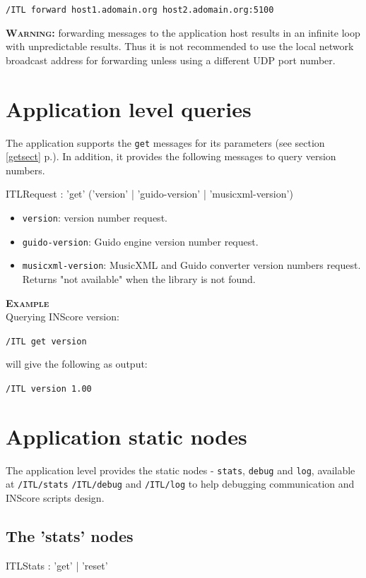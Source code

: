 \documentclass[a4paper,twoside]{report}
\newcommand{\sublevel}[1]	{\section{#1}}
\newcommand{\subsublevel}[1]	{\subsection{#1}}
\newcommand{\fullref}[1]	{\ref{#1} p.\pageref{#1}}
\newcommand{\OSC}[1]		{\texttt{#1}}
\newcommand{\example}		{\textbf{\hspace{-1.5cm}\textbf{\textsc{Example }}}}
\newcommand{\sample}	[1]			{\vspace{-2mm}\begin{center}\colorbox{mygrey}{
								\begin{minipage}[t]{0.9\columnwidth} 
								{\small \texttt{#1}}
								\end{minipage}}\end{center}}
\newcommand{\sampleindent}	{ \hspace{0.5cm} }
\newcommand{\warning}[1]	{\textbf{\textsc{Warning:}} #1}
\begin{document}
\sample{/ITL forward host1.adomain.org host2.adomain.org:5100}

\warning{forwarding messages to the application host results in an infinite loop with unpredictable results. Thus it is not recommended to use the local network broadcast address for forwarding unless using a different UDP port number.}



\sublevel{Application level queries}
\label{ITLQuery}

The application supports the \OSC{get} messages for its parameters (see section \fullref{getsect}). In addition, it provides the following messages to query version numbers.

\begin{rail}
ITLRequest : 'get'  ('version' | 'guido-version' | 'musicxml-version')
\end{rail}

\begin{itemize}
\item \OSC{version}: version number request.
\item \OSC{guido-version}: Guido engine version number request.
\item \OSC{musicxml-version}: MusicXML and Guido converter version numbers request. Returns "not available" when the library is not found.

\end{itemize}

\example \\
Querying INScore version:
\sample{/ITL get version}
\sampleindent will give the following as output:
\sample{/ITL version 1.00}

\sublevel{Application static nodes}
\label{ITLStatic}

The application level provides the static nodes - \OSC{stats}, \OSC{debug} and \OSC{log}, available at \OSC{/ITL/stats} \OSC{/ITL/debug} and \OSC{/ITL/log}  to help debugging communication and INScore scripts design.

\subsublevel{The 'stats' nodes}
\label{ITLstat}

\begin{rail}
ITLStats : 'get'  | 'reset'
\end{rail}
\end{document}
